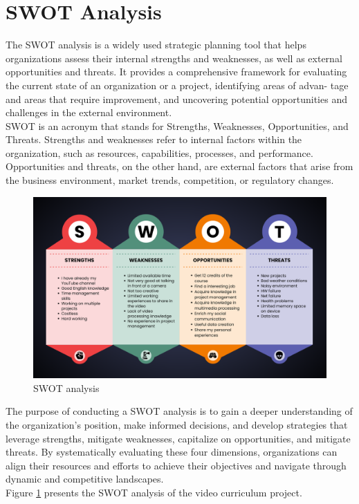 \documentclass[eng]{class}
\begin{document}
\section{SWOT Analysis}
The SWOT analysis is a widely used strategic planning tool that helps organizations assess their internal strengths and weaknesses,
as well as external opportunities and threats. It provides a comprehensive framework for evaluating the current state of an organization or a project,
identifying areas of advan-
\clearpage
\noindent
tage and areas that require improvement, and uncovering potential opportunities and challenges in the external environment.\\
SWOT is an acronym that stands for Strengths, Weaknesses, Opportunities, and Threats. Strengths and weaknesses refer to internal factors within the organization,
such as resources, capabilities, processes, and performance.
Opportunities and threats, on the other hand, are external factors that arise from the
business environment, market trends,
competition, or regulatory changes.
\begin{figure}[t!]
  \centering
  \includegraphics[width=\textwidth]{images/SWOT.png}
  \caption{SWOT analysis}
  \label{fig-3}
\end{figure}
\noindent
The purpose of conducting a SWOT analysis is to gain a deeper understanding of the organization's position,
make informed decisions, and develop strategies that leverage strengths, mitigate weaknesses, capitalize on opportunities,
and mitigate threats. By systematically evaluating these four dimensions, organizations can align their resources and efforts to achieve their
objectives and navigate through dynamic and competitive landscapes.\\
Figure \ref{fig-3} presents the SWOT analysis of the video curriculum project.
\end{document}
